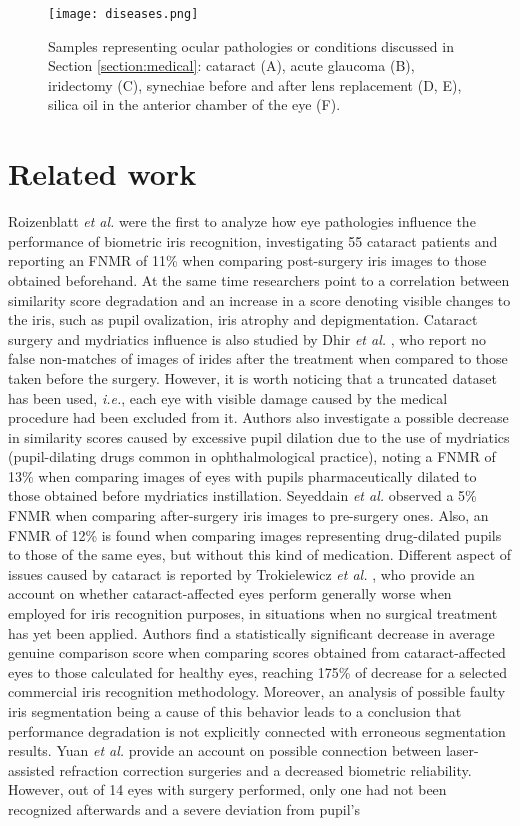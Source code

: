 \documentclass[conference]{IEEEtran}
\begin{document}
\begin{figure*}[!t]
\centering
\texttt{[image: diseases.png]}
\caption{Samples representing ocular pathologies or conditions discussed in Section \ref{section:medical}: cataract (A), acute glaucoma (B), iridectomy (C), synechiae before and after lens replacement (D, E), silica oil in the anterior chamber of the eye (F).}
\label{fig:diseases}
\end{figure*}

\section{Related work}

Roizenblatt \emph{et al.} \cite{Roizenblatt} were the first to analyze how eye pathologies influence the performance of biometric iris recognition, investigating 55 cataract patients and reporting an FNMR of 11\% when comparing post-surgery iris images to those obtained beforehand. At the same time researchers point to a correlation between similarity score degradation and an increase in a score denoting visible changes to the iris, such as pupil ovalization, iris atrophy and depigmentation. Cataract surgery and mydriatics influence is also studied by Dhir \emph{et al.} \cite{Dhir}, who report no false non-matches of images of irides after the treatment when compared to those taken before the surgery. However, it is worth noticing that a truncated dataset has been used, \emph{i.e.}, each eye with visible damage caused by the medical procedure had been excluded from it. Authors also investigate a possible decrease in similarity scores caused by excessive pupil dilation due to the use of mydriatics (pupil-dilating drugs common in ophthalmological practice), noting a FNMR of 13\% when comparing images of eyes with pupils pharmaceutically dilated to those obtained before mydriatics instillation. Seyeddain \emph{et al.} \cite{Seyeddain2014} observed a 5\% FNMR when comparing after-surgery iris images to pre-surgery ones. Also, an FNMR of 12\% is found when comparing images representing drug-dilated pupils to those of the same eyes, but without this kind of medication. Different aspect of issues caused by cataract is reported by Trokielewicz \emph{et al.} \cite{TrokielewiczWilga2014}, who provide an account on whether cataract-affected eyes perform generally worse when employed for iris recognition purposes, in situations when no surgical treatment has yet been applied. Authors find a statistically significant decrease in average genuine comparison score when comparing scores obtained from cataract-affected eyes to those calculated for healthy eyes, reaching 175\% of decrease for a selected commercial iris recognition methodology. Moreover, an analysis of possible faulty iris segmentation being a cause of this behavior leads to a conclusion that performance degradation is not explicitly connected with erroneous segmentation results. Yuan \emph{et al.} \cite{Yuan} provide an account on possible connection between laser-assisted refraction correction surgeries and a decreased biometric reliability. However, out of 14 eyes with surgery performed, only one had not been recognized afterwards and a severe deviation from pupil's 
\end{document}
